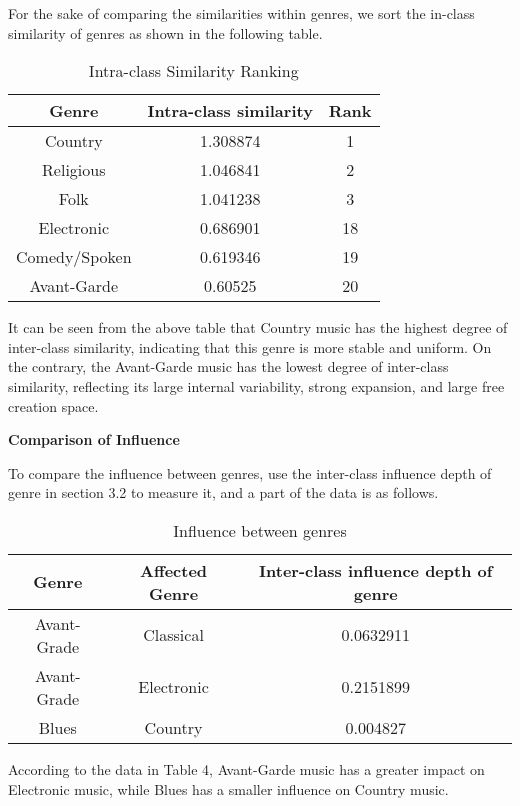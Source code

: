 \documentclass{mcmthesis}
\begin{document}
 For the sake of comparing the similarities within genres, we sort the in-class similarity of genres as shown in the following table. 
\begin{table}[H]
	\centering  
	\caption{Intra-class Similarity Ranking}
	
	\label{table_time}
	
	\begin{tabular}{ccc}  
		
		\toprule   
		
		Genre& Intra-class similarity&Rank \\ 
		\midrule    
		Country&1.308874&1
		\\  
		Religious & 1.046841&2 
		\\ 
		Folk & 1.041238&3
		\\       
		Electronic &0.686901&18
		\\
		Comedy$/$Spoken&0.619346&19
		\\
		Avant-Garde&0.60525&20
		\\
		\bottomrule  
		
	\end{tabular}
\end{table}
It can be seen from the above table that Country music has the highest degree of inter-class similarity, indicating that this genre is more stable and uniform. On the contrary, the Avant-Garde music has the lowest degree of inter-class similarity, reflecting its large internal variability, strong expansion, and large free creation space.



\noindent%
\textbf{Comparison of Influence} 

 To compare the influence between genres, use the inter-class influence depth of genre in section 3.2 to measure it, and a part of the data is as follows.
 \begin{table}[H]
 	\centering  
 	\caption{Influence between genres}
 	
 	\label{table_time}
 	
 	\begin{tabular}{ccc}  
 		
 		\toprule   
 		
Genre&Affected Genre &Inter-class influence depth of genre \\ 
 	\midrule   
 		Avant-Grade & Classical &0.0632911 \\
 		Avant-Grade & Electronic &0.2151899    \\ 
 		Blues&Country&0.004827  \\    
 		
 		\bottomrule  
 		
 	\end{tabular}
 \end{table}
According to the data in Table 4, Avant-Garde music has a greater impact on Electronic music, while Blues has a smaller influence on Country music.
\end{document}
